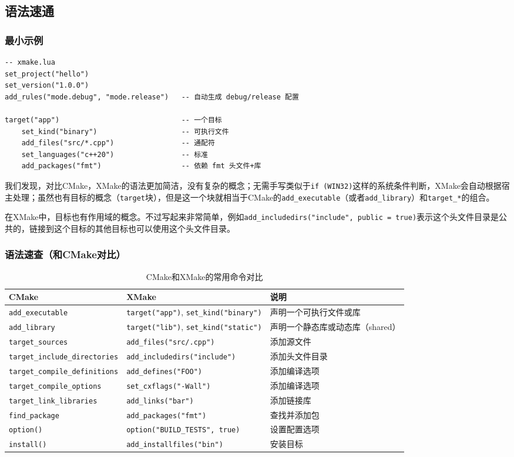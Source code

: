 \documentclass[../main.tex]{subfiles}
\begin{document}
\subsection{语法速通}
\subsubsection{最小示例}
\begin{lstlisting}
-- xmake.lua
set_project("hello")
set_version("1.0.0")
add_rules("mode.debug", "mode.release")   -- 自动生成 debug/release 配置

target("app")                             -- 一个目标
    set_kind("binary")                    -- 可执行文件
    add_files("src/*.cpp")                -- 通配符
    set_languages("c++20")                -- 标准
    add_packages("fmt")                   -- 依赖 fmt 头文件+库
\end{lstlisting}
我们发现，对比CMake，XMake的语法更加简洁，没有复杂的概念；无需手写类似于\texttt{if (WIN32)}这样的系统条件判断，XMake会自动根据宿主处理；虽然也有目标的概念（\texttt{target}块），但是这一个块就相当于CMake的\texttt{add\_executable}（或者\texttt{add\_library}）和\texttt{target\_*}的组合。

在XMake中，目标也有作用域的概念。不过写起来非常简单，例如\texttt{add\_includedirs("include", {public = true})}表示这个头文件目录是公共的，链接到这个目标的其他目标也可以使用这个头文件目录。

\subsubsection{语法速查（和CMake对比）}

\begin{table}
\centering
\begin{tabular}{l|l|l}
\hline
CMake & XMake & 说明 \\
\hline
\texttt{add\_executable} & \texttt{target("app")}, \texttt{set\_kind("binary")} & 声明一个可执行文件或库 \\
\texttt{add\_library} & \texttt{target("lib")}, \texttt{set\_kind("static")} & 声明一个静态库或动态库（shared） \\
\texttt{target\_sources} & \texttt{add\_files("src/\*.cpp")} & 添加源文件 \\
\texttt{target\_include\_directories} & \texttt{add\_includedirs("include")} & 添加头文件目录 \\
\texttt{target\_compile\_definitions} & \texttt{add\_defines("FOO")} & 添加编译选项 \\
\texttt{target\_compile\_options} & \texttt{set\_cxflags("-Wall")} & 添加编译选项 \\
\texttt{target\_link\_libraries} & \texttt{add\_links("bar")} & 添加链接库 \\
\texttt{find\_package} & \texttt{add\_packages("fmt")} & 查找并添加包 \\
\texttt{option()} & \texttt{option("BUILD\_TESTS", true)} & 设置配置选项 \\
\texttt{install()} & \texttt{add\_installfiles("bin")} & 安装目标 \\
\hline
\end{tabular}
\caption{CMake和XMake的常用命令对比}
\end{table}
\end{document}
